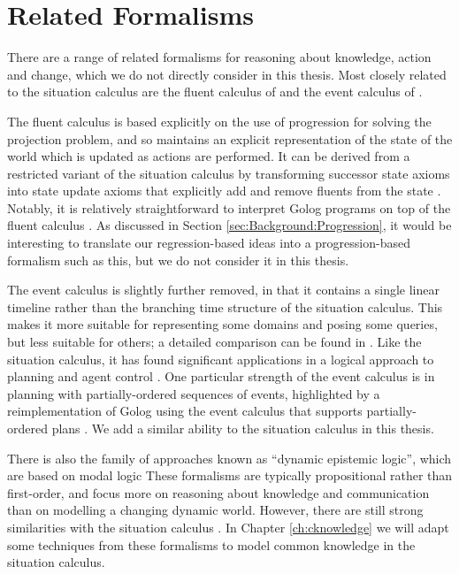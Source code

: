 \section{Related Formalisms}

\label{sec:Background:Related-Formalisms}

There are a range of related formalisms for reasoning about knowledge,
action and change, which we do not directly consider in this thesis.
Most closely related to the situation calculus are the fluent calculus
of \citet{thielscher98fluent_calculus} and the event calculus of
\citet{kowalski86event_calculus}.

The fluent calculus is based explicitly on the use of progression
for solving the projection problem, and so maintains an explicit representation
of the state of the world which is updated as actions are performed.
It can be derived from a restricted variant of the situation calculus
by transforming successor state axioms into state update axioms that
explicitly add and remove fluents from the state \citep{thielscher99fluentcalc_from_sitcalc}.
Notably, it is relatively straightforward to interpret Golog programs
on top of the fluent calculus \citep{thielscher05golog_in_flux}.
As discussed in Section \ref{sec:Background:Progression}, it would
be interesting to translate our regression-based ideas into a progression-based
formalism such as this, but we do not consider it in this thesis.

The event calculus is slightly further removed, in that it contains
a single linear timeline rather than the branching time structure
of the situation calculus. This makes it more suitable for representing
some domains and posing some queries, but less suitable for others;
a detailed comparison can be found in \citep{kowalski97reconcile_sitcalc_evtcalc,belleghem97sitcalc_evtcalc}.
Like the situation calculus, it has found significant applications
in a logical approach to planning and agent control \citep{shanahan00ec_planner}.
One particular strength of the event calculus is in planning with
partially-ordered sequences of events, highlighted by a reimplementation
of Golog using the event calculus that supports partially-ordered
plans \citep{pereira04ec_golog}. We add a similar ability to the
situation calculus in this thesis.

There is also the family of approaches known as {}``dynamic epistemic
logic'', which are based on modal logic \citep{baltag98pa_ck,vanBenthem06lcc,vanBentham06tree_of_knowledge}
These formalisms are typically propositional rather than first-order,
and focus more on reasoning about knowledge and communication than
on modelling a changing dynamic world. However, there are still strong
similarities with the situation calculus \citep{vanbentham07ml_sitcalc}.
In Chapter \ref{ch:cknowledge} we will adapt some techniques from
these formalisms to model common knowledge in the situation calculus.

